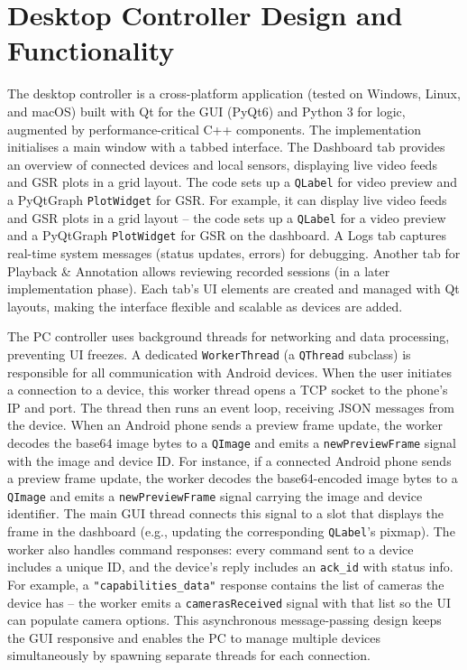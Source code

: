 \section{Desktop Controller Design and Functionality}\label{sec:4-3}
The desktop controller is a cross-platform application (tested on Windows, Linux, and macOS) built with Qt for the GUI (PyQt6) \cite{ref17} and Python 3 for logic, augmented by performance-critical C++ components. The implementation initialises a main window with a tabbed interface. The Dashboard tab provides an overview of connected devices and local sensors, displaying live video feeds and GSR plots in a grid layout. The code sets up a \texttt{QLabel} for video preview and a PyQtGraph \texttt{PlotWidget} for GSR. For example, it can display live video feeds and GSR plots in a grid layout -- the code sets up a \texttt{QLabel} for a video preview and a PyQtGraph \texttt{PlotWidget} for GSR on the dashboard. A Logs tab captures real-time system messages (status updates, errors) for debugging. Another tab for Playback \& Annotation allows reviewing recorded sessions (in a later implementation phase). Each tab's UI elements are created and managed with Qt layouts, making the interface flexible and scalable as devices are added.

The PC controller uses background threads for networking and data processing, preventing UI freezes. A dedicated \texttt{WorkerThread} (a \texttt{QThread} subclass) is responsible for all communication with Android devices. When the user initiates a connection to a device, this worker thread opens a TCP socket to the phone's IP and port. The thread then runs an event loop, receiving JSON messages from the device. When an Android phone sends a preview frame update, the worker decodes the base64 image bytes to a \texttt{QImage} and emits a \texttt{newPreviewFrame} signal with the image and device ID. For instance, if a connected Android phone sends a preview frame update, the worker decodes the base64-encoded image bytes to a \texttt{QImage} and emits a \texttt{newPreviewFrame} signal carrying the image and device identifier. The main GUI thread connects this signal to a slot that displays the frame in the dashboard (e.g., updating the corresponding \texttt{QLabel}'s pixmap). The worker also handles command responses: every command sent to a device includes a unique ID, and the device's reply includes an \texttt{ack\_id} with status info. For example, a \texttt{"capabilities\_data"} response contains the list of cameras the device has -- the worker emits a \texttt{camerasReceived} signal with that list so the UI can populate camera options. This asynchronous message-passing design keeps the GUI responsive and enables the PC to manage multiple devices simultaneously by spawning separate threads for each connection.

